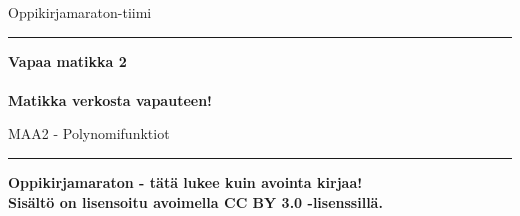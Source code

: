 
\begin{center}
    \begin{doublespace}
        \begin{LARGE}
            \textrm{Oppikirjamaraton-tiimi} \\
        \end{LARGE}
      
        \vspace{0.5cm}
        \hrule height 2pt
        \vspace{1cm}
        \begin{Huge}
            \textbf{\textrm{Vapaa matikka 2}\\\ \\Matikka verkosta vapauteen!}
        \end{Huge}
      
      
        \vfill
      
        \begin{huge}
            \textrm{MAA2 - Polynomifunktiot}
        \end{huge}
        \vspace{1cm}
        \hrule height 2pt
    \end{doublespace}
\end{center}

\vfill

\begin{flushright}
    \textbf{
        Oppikirjamaraton - tätä lukee kuin avointa kirjaa! \\
        Sisältö on lisensoitu avoimella CC BY 3.0 -lisenssillä. \\
    }
\end{flushright}
